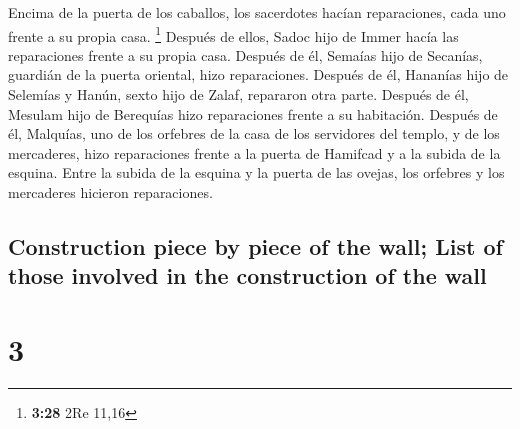 \begin{paracol}{2}
 Encima de la puerta de los caballos, los sacerdotes
hacían reparaciones, cada uno frente a su propia casa. \footnote{\textbf{3:28}
  2Re 11,16}  Después de ellos, Sadoc hijo de Immer hacía
las reparaciones frente a su propia casa. Después de él, Semaías hijo de
Secanías, guardián de la puerta oriental, hizo reparaciones.
 Después de él, Hananías hijo de Selemías y Hanún, sexto
hijo de Zalaf, repararon otra parte. Después de él, Mesulam hijo de
Berequías hizo reparaciones frente a su habitación. 
Después de él, Malquías, uno de los orfebres de la casa de los
servidores del templo, y de los mercaderes, hizo reparaciones frente a
la puerta de Hamifcad y a la subida de la esquina.  Entre
la subida de la esquina y la puerta de las ovejas, los orfebres y los
mercaderes hicieron reparaciones.

\switchcolumn
\begin{otherlanguage}{english}

\hypertarget{construction-piece-by-piece-of-the-wall-list-of-those-involved-in-the-construction-of-the-wall}{%
\subsection{Construction piece by piece of the wall; List of those
involved in the construction of the
wall}\label{construction-piece-by-piece-of-the-wall-list-of-those-involved-in-the-construction-of-the-wall}}

\hypertarget{section-5}{%
\section{3}\label{section-5}}


\end{otherlanguage}
\end{paracol}
